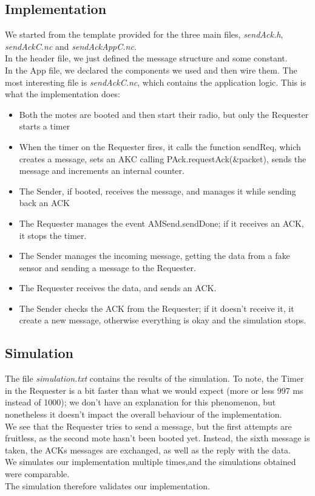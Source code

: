 \documentclass[12pt]{article}
\begin{document}
\subsection{Implementation}
We started from the template provided for the three main files, \emph{sendAck.h}, \emph{sendAckC.nc} and \emph{sendAckAppC.nc}. \\
In the header file, we just defined the message structure and some constant.\\
In the App file, we declared the components we used and then wire them. 
The most interesting file is \emph{sendAckC.nc}, which contains the application logic. This is what the implementation does:\\
\begin{itemize}
\item Both the motes are booted and then start their radio, but only the Requester starts a timer
\item When the timer on the Requester fires, it calls the function sendReq, which creates a message, sets an AKC calling PAck.requestAck(\&packet), sends the message and increments an internal counter. 
\item The Sender, if booted, receives the message, and manages it while sending back an ACK
\item The Requester manages the event AMSend.sendDone; if it receives an ACK, it stops the timer.
\item The Sender manages the incoming message, getting the data from a fake sensor and sending a message to the Requester.
\item The Requester receives the data, and sends an ACK.
\item The Sender checks the ACK from the Requester; if it doesn't receive it, it create a new message, otherwise everything is okay and the simulation stops. 
\end{itemize}
\subsection{Simulation}
The file \emph{simulation.txt} contains the results of the simulation. To note, the Timer in the Requester is a bit faster than what we would expect (more or less 997 ms instead of 1000); we don't have an explanation for this phenomenon, but nonetheless it doesn't impact the overall behaviour of the implementation.\\
We see that the Requester tries to send a message, but the first attempts are fruitless, as the second mote hasn't been booted yet. Instead, the sixth message is taken, the ACKs messages are exchanged, as well as the reply with the data. \\
We simulates our implementation multiple times,and the simulations obtained were comparable.\\
The simulation therefore validates our implementation.
\end{document}
